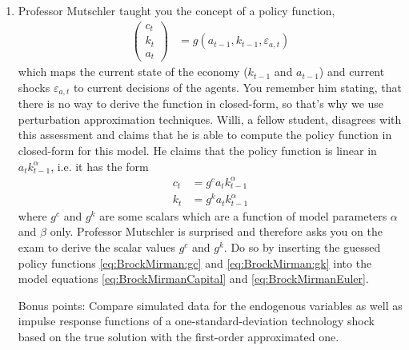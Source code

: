 \documentclass{article}
\begin{document}
\begin{enumerate}
\begin{enumerate}
    \end{enumerate}
\newpage
 	\item Professor Mutschler taught you the concept of a policy function,
   \begin{align*}
		\begin{pmatrix} c_{t}\\k_{t}\\a_{t} \end{pmatrix}
 		 &= g(a_{t-1},k_{t-1},\varepsilon_{a,t})
 	\end{align*}
   which maps the current state of the economy ($k_{t-1}$ and $a_{t-1}$) and current shocks $\varepsilon_{a,t}$ to current decisions of the agents.
   You remember him stating, that there is no way to derive the function in closed-form, so that's why we use perturbation approximation techniques.
   Willi, a fellow student, disagrees with this assessment and claims that he is able to compute the policy function in closed-form for this model.
   He claims that the policy function is linear in $ a_t k_{t-1}^\alpha$, i.e. it has the form
 	\begin{align}
 	c_{t} &= g^c a_t k_{t-1}^\alpha \label{eq:BrockMirman:gc}\\
 	k_{t} & = g^k a_t k_{t-1}^\alpha \label{eq:BrockMirman:gk}
 	\end{align}
  where $g^c$ and $g^k$ are some scalars which are a function of model parameters $\alpha$ and $\beta$ only.
 	Professor Mutschler is surprised and therefore asks you on the exam to derive the scalar values $g^c$ and $g^k$.
  Do so by inserting the guessed policy functions \eqref{eq:BrockMirman:gc} and \eqref{eq:BrockMirman:gk}
    into the model equations \eqref{eq:BrockMirmanCapital} and \eqref{eq:BrockMirmanEuler}.
 	\item [Bonus points:] Compare simulated data for the endogenous variables as well as impulse response functions of a one-standard-deviation technology shock based on the true solution with the first-order approximated one.
\end{enumerate} 
\end{document}

